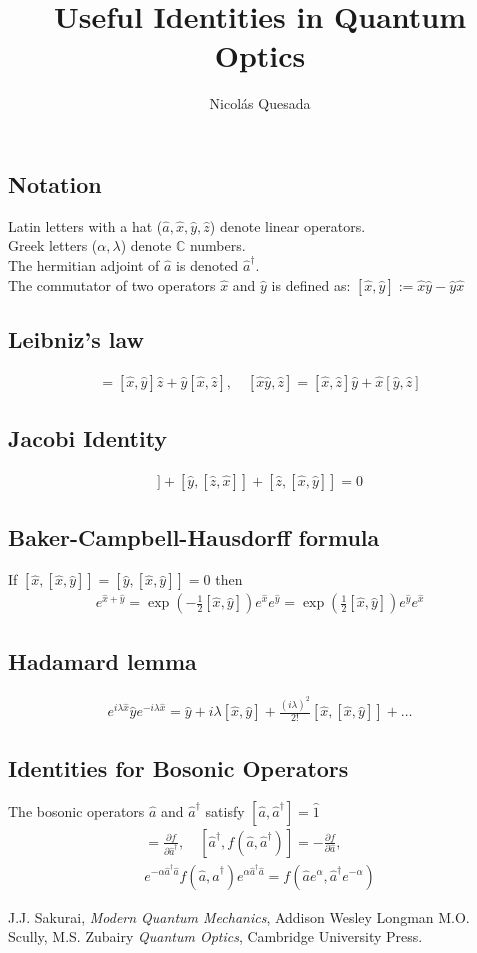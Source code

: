 \documentclass[english,11pt]{shreyasnotes}
\date{}
\title{Useful Identities in Quantum Optics}
\author{Nicol\'as Quesada}
\newcommand{\eq}[1]{\begin{align*}#1\end{align*}}
\begin{document}
\maketitle
\thispagestyle{empty}

\subsection*{Notation}
Latin letters with a hat ($\hat a, \hat x, \hat y, \hat z$) denote linear operators.\\
Greek letters ($\alpha, \lambda$) denote $\mathbb{C}$ numbers.\\
The hermitian adjoint of $\hat a$ is denoted $\hat a^{\dagger}$.\\
The commutator of two operators $\hat x$ and $\hat y$ is defined as:
$ [\hat x,\hat y] := \hat x \hat y-\hat y \hat x$ \\

\subsection*{Leibniz's law }

\eq{ [\hat x, \hat y \hat z]=[\hat x, \hat y] \hat z+\hat y[\hat x,\hat z], \quad 
 [\hat x \hat y, \hat z]=[\hat x, \hat z] \hat y+\hat x[\hat y,\hat z] 
}

\subsection*{Jacobi Identity}
\eq{
 [\hat x, [ \hat y, \hat z]]+[ \hat y,[ \hat z,\hat x]]+[\hat z, [\hat x, \hat y]]=0 
}
\subsection*{Baker-Campbell-Hausdorff formula}
If $[\hat x,[\hat x,\hat y]]=[\hat y,[\hat x,\hat y]]=0$ then
\eq{e^{\hat x+\hat y}=\exp{\left(-\frac{1}{2} [\hat x,\hat y] \right)} e^{\hat x} e^{\hat y}=\exp{\left(\frac{1}{2} [\hat x,\hat y] \right)} e^{\hat y} e^{\hat x} }

\subsection*{Hadamard lemma}
\eq{ e^{ i \lambda \hat x} \hat y e^{- i \lambda \hat x}=\hat y + i \lambda [\hat x,\hat y]+\frac{(i \lambda)^2}{2!}[\hat x,[\hat x,\hat y]]+\ldots}

\subsection*{Identities for Bosonic Operators}
The bosonic operators $\hat a$ and $\hat a^\dagger$ satisfy $[\hat a,\hat a^\dagger]=\hat 1$
\eq{[\hat a,f(\hat a,\hat a^\dagger)]=\frac{\partial f}{\partial \hat a^\dagger}, \quad 
 [\hat a^\dagger,f(\hat a,\hat a^\dagger)]=-\frac{\partial f}{\partial \hat a},\\
e^{-\alpha \hat a^\dagger \hat a} f(\hat a,\hat a^\dagger) e^{\alpha \hat a^\dagger \hat a}=f(\hat a e^\alpha,\hat a^\dagger e^{-\alpha})
}

\begin{thebibliography}{}
\bibitem{} J.J. Sakurai, \textit{Modern Quantum Mechanics}, Addison Wesley Longman
\bibitem{} M.O. Scully, M.S. Zubairy \textit{Quantum Optics}, Cambridge University Press.
\end{thebibliography}
\end{document}
